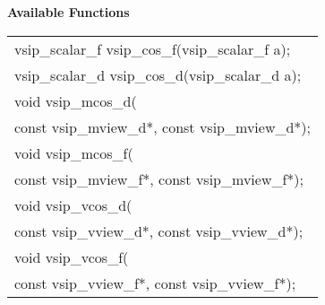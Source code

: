 \cvsiplh
\newline \hspace*{.8cm} \vspace*{.1cm} \textbf{Available Functions }
\newline \hspace*{1.1cm} {
\ttfamily
\begin{tabular}[H]{l}
vsip\_scalar\_f vsip\_cos\_f(vsip\_scalar\_f a);\\
vsip\_scalar\_d vsip\_cos\_d(vsip\_scalar\_d a);\\
void vsip\_mcos\_d(\\*
\hspace{1cm}const vsip\_mview\_d*, const vsip\_mview\_d*);\\
void vsip\_mcos\_f(\\*
\hspace{1cm}const vsip\_mview\_f*, const vsip\_mview\_f*);\\
void vsip\_vcos\_d(\\*
\hspace{1cm}const vsip\_vview\_d*, const vsip\_vview\_d*);\\
void vsip\_vcos\_f(\\*
\hspace{1cm}const vsip\_vview\_f*, const vsip\_vview\_f*);\\
\end{tabular}
}
\pyjvsiph
{}
